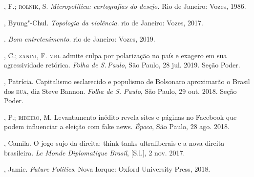 \begin{bibliohedra}
, F.; \textsc{rolnik}, S. \textit{Micropolítica: cartografias do desejo.}
Rio de Janeiro: Vozes, 1986.

, Byung"-Chul. \textit{Topologia da violência}. rio de Janeiro: Vozes,
2017.

\titidem. \textit{Bom entretenimento}. rio de Janeiro: Vozes, 2019.

, C.; \textsc{zanini}, F. \textsc{mbl} admite culpa por polarização no país e
exagero em sua agressividade retórica. \textit{Folha de S.\,Paulo}, São
Paulo, 28 jul. 2019. Seção Poder.

, Patrícia. Capitalismo esclarecido e populismo de Bolsonaro
aproximarão o Brasil dos \textsc{eua}, diz Steve Bannon. \textit{Folha de S.
Paulo}, São Paulo, 29 out. 2018. Seção Poder. 

, P.; \textsc{ribeiro}, M. Levantamento inédito revela sites e páginas
no Facebook que podem influenciar a eleição com fake news. \textit{Época},
São Paulo, 28 ago. 2018. 

, Camila. O jogo sujo da direita: think tanks ultraliberais e a
nova direita brasileira. \textit{Le Monde Diplomatique Brasil},
{[}S.l.{]}, 2 nov. 2017. 

, Jamie. \textit{Future Politics}. Nova Iorque: Oxford University
Press, 2018.
\end{bibliohedra}


\begin{flushright}
\end{flushright}


